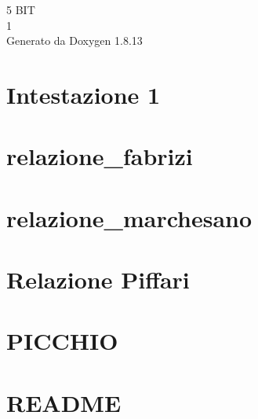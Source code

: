 \documentclass[twoside]{book}
\newcommand{\+}{\discretionary{\mbox{\scriptsize$\hookleftarrow$}}{}{}}
\newcommand{\clearemptydoublepage}{%
  \newpage{\pagestyle{empty}\cleardoublepage}%
}
\begin{document}
\hypersetup{pageanchor=false,
             bookmarksnumbered=true,
             pdfencoding=unicode
            }
\begin{titlepage}
\vspace*{7cm}
\begin{center}%
{\Large 5 B\+IT \\[1ex]\large 1 }\\
\vspace*{1cm}
{\large Generato da Doxygen 1.8.13}\\
\end{center}
\end{titlepage}
\clearemptydoublepage
{}
\tableofcontents
\clearemptydoublepage
{}
\hypersetup{pageanchor=true}

\chapter{Intestazione 1}
\label{md_documenti_documentazione_prova}

\chapter{relazione\+\_\+fabrizi}
\label{md_documenti_documentazione_relazione_fabrizi}

\chapter{relazione\+\_\+marchesano}
\label{md_documenti_documentazione_relazione_marchesano}

\chapter{Relazione Piffari}
\label{md_documenti_documentazione_relazione_piffari}

\chapter{P\+I\+C\+C\+H\+IO}
\label{md_documenti_PICCHIO}

\chapter{R\+E\+A\+D\+ME}
\label{md_manuali_sito_css_README}

\end{document}

